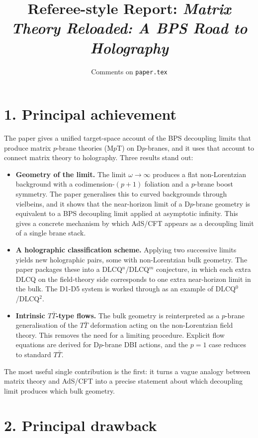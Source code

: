 \documentclass[11pt]{article}
\title{Referee-style Report: \emph{Matrix Theory Reloaded: A BPS Road to Holography}}
\author{Comments on \texttt{paper.tex}}
\date{}
\begin{document}
\maketitle

\section*{1. Principal achievement}

The paper gives a unified target-space account of the BPS decoupling limits that produce matrix $p$-brane theories (M$p$T) on D$p$-branes, and it uses that account to connect matrix theory to holography. Three results stand out:

\begin{itemize}
\item \textbf{Geometry of the limit.} The limit $\omega\to\infty$ produces a flat non-Lorentzian background with a codimension-$(p+1)$ foliation and a $p$-brane boost symmetry. The paper generalises this to curved backgrounds through vielbeins, and it shows that the near-horizon limit of a D$p$-brane geometry is equivalent to a BPS decoupling limit applied at asymptotic infinity. This gives a concrete mechanism by which AdS/CFT appears as a decoupling limit of a single brane stack.
\item \textbf{A holographic classification scheme.} Applying two successive limits yields new holographic pairs, some with non-Lorentzian bulk geometry. The paper packages these into a DLCQ$^n$/DLCQ$^m$ conjecture, in which each extra DLCQ on the field-theory side corresponds to one extra near-horizon limit in the bulk. The D1-D5 system is worked through as an example of DLCQ$^0$/DLCQ$^2$.
\item \textbf{Intrinsic $T\bar T$-type flows.} The bulk geometry is reinterpreted as a $p$-brane generalisation of the $T\bar T$ deformation acting on the non-Lorentzian field theory. This removes the need for a limiting procedure. Explicit flow equations are derived for D$p$-brane DBI actions, and the $p=1$ case reduces to standard $T\bar T$.
\end{itemize}

The most useful single contribution is the first: it turns a vague analogy between matrix theory and AdS/CFT into a precise statement about which decoupling limit produces which bulk geometry.

\section*{2. Principal drawback}
\end{document}
